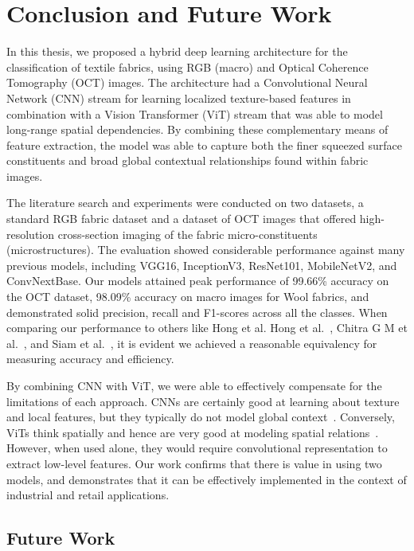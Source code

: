 \section{Conclusion and Future Work}
\raggedbottom

In this thesis, we proposed a hybrid deep learning architecture for the classification of textile fabrics, using RGB (macro) and Optical Coherence Tomography (OCT) images. The architecture had a Convolutional Neural Network (CNN) stream for learning localized texture-based features in combination with a Vision Transformer (ViT) stream that was able to model long-range spatial dependencies. By combining these complementary means of feature extraction, the model was able to capture both the finer squeezed surface constituents and broad global contextual relationships found within fabric images.

The literature search and experiments were conducted on two datasets, a standard RGB fabric dataset and a dataset of OCT images that offered high-resolution cross-section imaging of the fabric micro-constituents (microstructures). The evaluation showed considerable performance against many previous models, including VGG16, InceptionV3, ResNet101, MobileNetV2, and ConvNextBase. Our models attained peak performance of 99.66\% accuracy on the OCT dataset, 98.09\% accuracy on macro images for Wool fabrics, and demonstrated solid precision, recall and F1-scores across all the classes. When comparing our performance to others like Hong et al.  Hong et al.~\cite{hong2024research}, Chitra G M et al.~\cite{chitra2023fabric}, and Siam et al.~\cite{siam2023textilenet}, it is evident we achieved a reasonable equivalency for measuring accuracy and efficiency.

By combining CNN with ViT, we were able to effectively compensate for the limitations of each approach. CNNs are certainly good at learning about texture and local features, but they typically do not model global context~\cite{simonyan2015vgg}. Conversely, ViTs think spatially and hence are very good at modeling spatial relations~\cite{dosovitskiy2020vit}. However, when used alone, they would require convolutional representation to extract low-level features. Our work confirms that there is value in using two models, and demonstrates that it can be effectively implemented in the context of industrial and retail applications.

\subsection*{Future Work}

